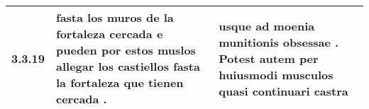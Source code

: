 \begin{tabular}{|p{1cm}|p{6.5cm}|p{6.5cm}|}

\hline
3.3.19 & fasta los muros de la fortaleza cercada \textbf{ e pueden por estos muslos allegar los castiellos } fasta la fortaleza que tienen cercada . & usque ad moenia munitionis obsessae . \textbf{ Potest autem per huiusmodi musculos } quasi continuari castra \\\hline

\end{tabular}
